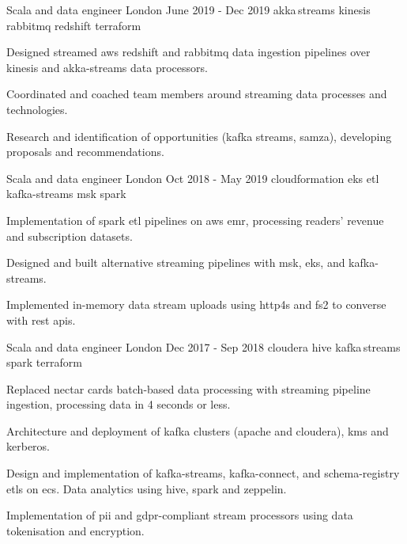 \begin{cventries}
    \cventry
    {Scala and data engineer}
    {} %
    {London} %
    {June 2019 - Dec 2019} %
    { akka\,streams {} kinesis {} rabbitmq {} redshift {} terraform}
    {
        \begin{cvitems}
            \item{Designed streamed aws redshift and rabbitmq data ingestion pipelines over kinesis and akka-streams data processors. }
            \item{Coordinated and coached team members around streaming data processes and technologies.}
            \item{Research and identification of opportunities (kafka streams, samza), developing proposals and recommendations.}
        \end{cvitems}
    }

    \cventry
    {Scala and data engineer}
    {} %
    {London} %
    {Oct 2018 - May 2019} %
    {cloudformation {} eks {} etl {} kafka-streams {} msk {} spark}
    {
        \begin{cvitems}
            \item{Implementation of spark etl pipelines on aws emr, processing readers' revenue and subscription datasets.}
            \item{Designed and built alternative streaming pipelines with msk, eks, and kafka-streams.}
            \item{Implemented in-memory data stream uploads using http4s and fs2 to converse with rest apis.}
        \end{cvitems}
    }

    \cventry
    {Scala and data engineer}
    {} %
    {London} %
    {Dec 2017 - Sep 2018} %
    {cloudera {} hive {} kafka\,streams {} spark {} terraform}
    {
        \begin{cvitems}
            \item{Replaced nectar cards batch-based data processing with streaming pipeline ingestion, processing data in 4 seconds or less.}
            \item{Architecture and deployment of kafka clusters (apache and cloudera), kms and kerberos.}
            \item{Design and implementation of kafka-streams, kafka-connect, and schema-registry etls on ecs. Data analytics using hive, spark and zeppelin.}
            \item{Implementation of pii and gdpr-compliant stream processors using data tokenisation and encryption.}
        \end{cvitems}
    }


\end{cventries}
